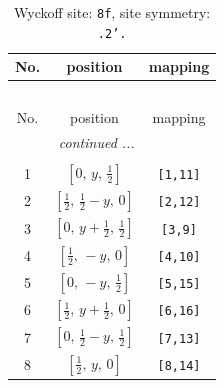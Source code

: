 \documentclass[fleqn,8pt]{jsarticle}
\begin{document}
\begin{longtable}{ccc}
\caption{Wyckoff site: {\tt 8f}, site symmetry: {\tt .2'.}}
 \\
 \hline \hline
No. & position & mapping \\ \hline \endfirsthead

\multicolumn{2}{l}{\tablename\ \thetable{}} \\
 \hline \hline
No. & position & mapping \\ \hline \endhead

 \hline \hline
\multicolumn{2}{r}{\footnotesize\it continued ...} \\ \endfoot

 \hline \hline
\multicolumn{2}{r}{} \\ \endlastfoot

1 & $\left[ 0,\, y,\, \frac{1}{2} \right]$ & {\tt [1,11]} \\ \hline
2 & $\left[ \frac{1}{2},\, \frac{1}{2} - y,\, 0 \right]$ & {\tt [2,12]} \\ \hline
3 & $\left[ 0,\, y + \frac{1}{2},\, \frac{1}{2} \right]$ & {\tt [3,9]} \\ \hline
4 & $\left[ \frac{1}{2},\, - y,\, 0 \right]$ & {\tt [4,10]} \\ \hline
5 & $\left[ 0,\, - y,\, \frac{1}{2} \right]$ & {\tt [5,15]} \\ \hline
6 & $\left[ \frac{1}{2},\, y + \frac{1}{2},\, 0 \right]$ & {\tt [6,16]} \\ \hline
7 & $\left[ 0,\, \frac{1}{2} - y,\, \frac{1}{2} \right]$ & {\tt [7,13]} \\ \hline
8 & $\left[ \frac{1}{2},\, y,\, 0 \right]$ & {\tt [8,14]} \\
\end{longtable}
\renewcommand{\arraystretch}{1.2}
\end{document}
